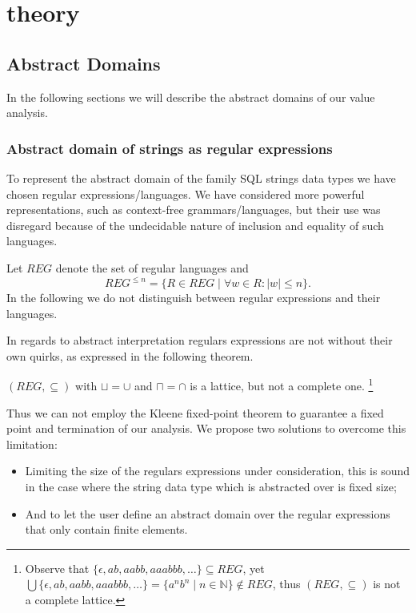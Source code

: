 \section{theory}\label{theory}

\subsection{Abstract Domains}\label{subsec:abstract_domains}

In the following sections we will describe the abstract domains of our value analysis.

\subsubsection{Abstract domain of strings as regular expressions}\label{subsubsec:abstract_domains_strings}

To represent the abstract domain of the family SQL strings data types we have chosen regular expressions/languages.
We have considered more powerful representations, such as context-free grammars/languages, but their use was disregard because of the undecidable nature of inclusion and equality of such languages.

Let $REG$ denote the set of regular languages and
\begin{equation*}
    REG^{\leq n} = \{R \in REG \mid \forall w \in R : |w| \leq n\}.
\end{equation*}
In the following we do not distinguish between regular expressions and their languages.

In regards to abstract interpretation regulars expressions are not without their own quirks, as expressed in the following theorem.

\begin{theorem}\label{thm:reg-lattice}
    $(REG, \subseteq)$ with $\sqcup = \cup$ and $\sqcap = \cap$ is a lattice, but not a complete one.
    \footnote{
        Observe that $\{ \epsilon, ab, aabb, aaabbb, \dots \} \subseteq REG$, yet $\bigcup\{ \epsilon, ab, aabb, aaabbb, \dots \} = \{a^nb^n \mid n \in \mathbb{N}\} \notin REG$, thus $(REG, \subseteq)$ is not a complete lattice.}
\end{theorem}

Thus we can not employ the Kleene fixed-point theorem to guarantee a fixed point and termination of our analysis.
We propose two solutions to overcome this limitation:
\begin{itemize}
    \item Limiting the size of the regulars expressions under consideration, this is sound in the case where the string data type which is abstracted over is fixed size;
    \item And to let the user define an abstract domain over the regular expressions that only contain finite elements.
\end{itemize}

